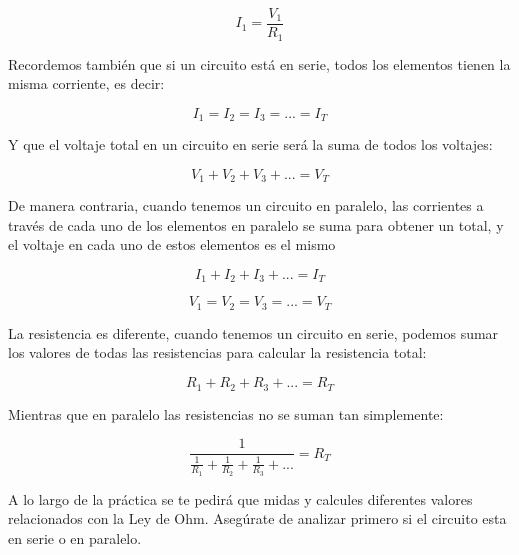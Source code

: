 		\begin{equation}
			I_1 = \frac{V_1}{R_1}
		\end{equation}

		Recordemos también que si un circuito está en serie, todos los elementos tienen la misma corriente, es decir:

		\begin{equation}
			I_1 = I_2 = I_3 = ... = I_T
		\end{equation}

		Y que el voltaje total en un circuito en serie será la suma de todos los voltajes:

		\begin{equation}
			V_1 + V_2 + V_3 + ... = V_T
		\end{equation}

		De manera contraria, cuando tenemos un circuito en paralelo, las corrientes a través de cada uno de los elementos en paralelo se suma para obtener un total, y el voltaje en cada uno de estos elementos es el mismo

		\begin{equation}
			I_1 + I_2 + I_3 + ... = I_T
		\end{equation}

		\begin{equation}
			V_1 = V_2 = V_3 = ... = V_T
		\end{equation}

		La resistencia es diferente, cuando tenemos un circuito en serie, podemos sumar los valores de todas las resistencias para calcular la resistencia total:

		\begin{equation}
			R_1 + R_2 + R_3 + ... = R_T
		\end{equation}

		Mientras que en paralelo las resistencias no se suman tan simplemente:

		\begin{equation}
			\frac{1}{\frac{1}{R_1} + \frac{1}{R_2} + \frac{1}{R_3} + ...} = R_T
		\end{equation}

		A lo largo de la práctica se te pedirá que midas y calcules diferentes valores relacionados con la Ley de Ohm. Asegúrate de analizar primero si el circuito esta en serie o en paralelo.


